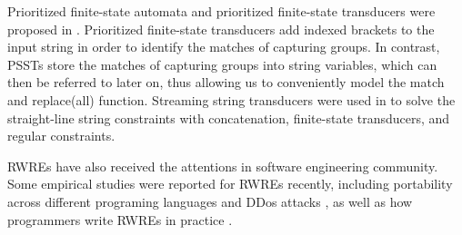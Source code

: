 Prioritized finite-state automata and prioritized finite-state transducers were proposed in \cite{BM17}. Prioritized finite-state transducers add indexed brackets to the input string in order to identify the matches of capturing groups. In contrast, PSSTs store the matches of capturing groups into string variables, which can then be referred to later on, thus allowing us to conveniently model the match and replace(all) function. 
%
Streaming string transducers were used in \cite{ZAM19} to solve the straight-line string constraints with concatenation, finite-state transducers, and regular constraints.

RWREs have also received the attentions in software engineering community. Some empirical studies were reported for RWREs recently, including portability across different programing languages \cite{DMC+19} and DDos attacks \cite{SP18}, as well as how programmers write RWREs in practice \cite{MDD+19}.

